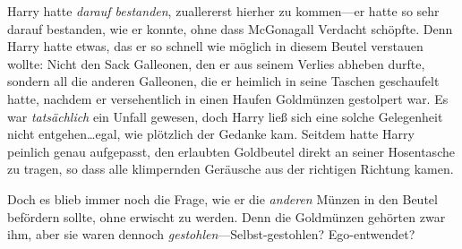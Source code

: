 Harry hatte \emph{darauf bestanden}, zuallererst hierher zu kommen—er hatte so sehr darauf bestanden, wie er konnte, ohne dass McGonagall Verdacht schöpfte. Denn Harry hatte etwas, das er so schnell wie möglich in diesem Beutel verstauen wollte: Nicht den Sack Galleonen, den er aus seinem Verlies abheben durfte, sondern all die anderen Galleonen, die er heimlich in seine Taschen geschaufelt hatte, nachdem er versehentlich in einen Haufen Goldmünzen gestolpert war. Es war \emph{tatsächlich} ein Unfall gewesen, doch Harry ließ sich eine solche Gelegenheit nicht entgehen…egal, wie plötzlich der Gedanke kam. Seitdem hatte Harry peinlich genau aufgepasst, den erlaubten Goldbeutel direkt an seiner Hosentasche zu tragen, so dass alle klimpernden Geräusche aus der richtigen Richtung kamen.

Doch es blieb immer noch die Frage, wie er die \emph{anderen} Münzen in den Beutel befördern sollte, ohne erwischt zu werden. Denn die Goldmünzen gehörten zwar ihm, aber sie waren dennoch \emph{gestohlen}—Selbst-gestohlen? Ego-entwendet?

